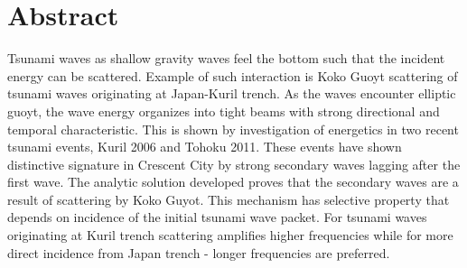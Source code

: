 \section{Abstract}
Tsunami waves as shallow gravity waves feel the bottom such that the incident energy can be scattered. Example of such interaction is Koko Guoyt scattering of tsunami waves originating at Japan-Kuril trench. As the waves encounter elliptic guoyt, the wave energy organizes into tight beams with strong directional and temporal characteristic. This is shown by investigation of energetics in two recent tsunami events, Kuril 2006 and Tohoku 2011. These events have shown distinctive signature in Crescent City by strong secondary waves lagging after the first wave. The analytic solution developed proves that the secondary waves are a result of scattering by Koko Guyot. This mechanism has selective property that depends on incidence of the initial tsunami wave packet. For tsunami waves originating at Kuril trench scattering amplifies higher frequencies while for more direct incidence from Japan trench - longer frequencies are preferred.

